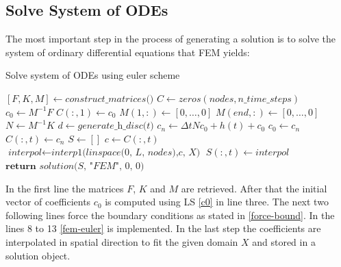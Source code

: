 \subsection{Solve System of ODEs}
The most important step in the process of generating a solution is to solve the system of ordinary differential equations that FEM yields:
\begin{algorithm}[H]
\caption{Solve system of ODEs using euler scheme}
\begin{algorithmic}[1]
\State $[F, K, M] \gets \textit{construct\_matrices()}$
\State $C \gets zeros(nodes, n\_time\_steps)$
\State $c_{0} \gets M^{-1}F$
\State $C(:, 1) \gets c_{0}$
\State $M(1, :) \gets [0, \hdots, 0]$
\State $M(end, :) \gets [0, \hdots, 0]$
\State $N \gets M^{-1}K$
\State $d \gets \textit{generate\_h\_disc(t)}$
\State $c_{n} \gets \Delta t N c_{0} + h(t) + c_{0} $
\State $c_{0} \gets c_{n}$
\State $C(:, t) \gets c_{n}$
\EndFor
\State $S \gets []$
\State $c \gets C(:, t)$
\State $\textit{interpol} \gets \textit{interp1(linspace(0, L, nodes),c, X)}$
\State $S(:, t) \gets \textit{interpol}$
\EndFor
\State $\textbf{return } \textit{solution(S, "FEM", 0, 0)}$
\end{algorithmic}
\end{algorithm}
In the first line the matrices \(F\), \(K\) and \(M\) are retrieved.
After that the initial vector of coefficients \(c_0\) is computed using LS \ref{c0} in line three.
The next two following lines force the boundary conditions as stated in \ref{force-bound}.
In the lines 8 to 13 \ref{fem-euler} is implemented.
In the last step the coefficients are interpolated in spatial direction to fit the given domain \(X\) and stored in a solution object.


	



